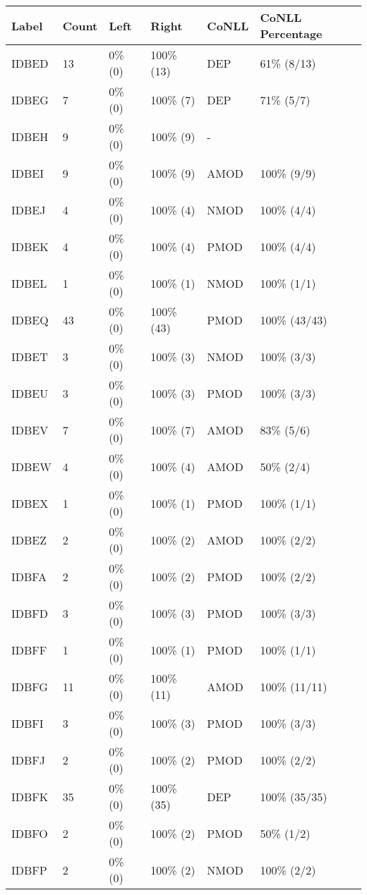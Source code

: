 \begin{figure*}
\begin{tabular}{|l|l|l|l||l|l|}
\hline
Label & Count & Left & Right & CoNLL & CoNLL Percentage\\ 
\hline
 IDBED & 13 & 0\% (0) & 100\% (13) & DEP & 61\% (8/13) \\ 
\hline
 IDBEG & 7 & 0\% (0) & 100\% (7) & DEP & 71\% (5/7) \\ 
\hline
 IDBEH & 9 & 0\% (0) & 100\% (9) & - &  \\ 
\hline
 IDBEI & 9 & 0\% (0) & 100\% (9) & AMOD & 100\% (9/9) \\ 
\hline
 IDBEJ & 4 & 0\% (0) & 100\% (4) & NMOD & 100\% (4/4) \\ 
\hline
 IDBEK & 4 & 0\% (0) & 100\% (4) & PMOD & 100\% (4/4) \\ 
\hline
 IDBEL & 1 & 0\% (0) & 100\% (1) & NMOD & 100\% (1/1) \\ 
\hline
 IDBEQ & 43 & 0\% (0) & 100\% (43) & PMOD & 100\% (43/43) \\ 
\hline
 IDBET & 3 & 0\% (0) & 100\% (3) & NMOD & 100\% (3/3) \\ 
\hline
 IDBEU & 3 & 0\% (0) & 100\% (3) & PMOD & 100\% (3/3) \\ 
\hline
 IDBEV & 7 & 0\% (0) & 100\% (7) & AMOD & 83\% (5/6) \\ 
\hline
 IDBEW & 4 & 0\% (0) & 100\% (4) & AMOD & 50\% (2/4) \\ 
\hline
 IDBEX & 1 & 0\% (0) & 100\% (1) & PMOD & 100\% (1/1) \\ 
\hline
 IDBEZ & 2 & 0\% (0) & 100\% (2) & AMOD & 100\% (2/2) \\ 
\hline
 IDBFA & 2 & 0\% (0) & 100\% (2) & PMOD & 100\% (2/2) \\ 
\hline
 IDBFD & 3 & 0\% (0) & 100\% (3) & PMOD & 100\% (3/3) \\ 
\hline
 IDBFF & 1 & 0\% (0) & 100\% (1) & PMOD & 100\% (1/1) \\ 
\hline
 IDBFG & 11 & 0\% (0) & 100\% (11) & AMOD & 100\% (11/11) \\ 
\hline
 IDBFI & 3 & 0\% (0) & 100\% (3) & PMOD & 100\% (3/3) \\ 
\hline
 IDBFJ & 2 & 0\% (0) & 100\% (2) & PMOD & 100\% (2/2) \\ 
\hline
 IDBFK & 35 & 0\% (0) & 100\% (35) & DEP & 100\% (35/35) \\ 
\hline
 IDBFO & 2 & 0\% (0) & 100\% (2) & PMOD & 50\% (1/2) \\ 
\hline
 IDBFP & 2 & 0\% (0) & 100\% (2) & NMOD & 100\% (2/2) \\ 

\end{tabular}
\end{figure*}
